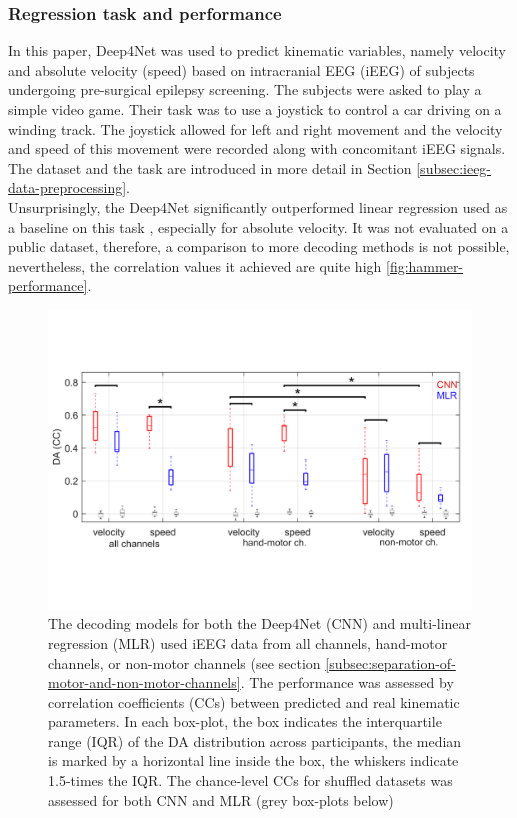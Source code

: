 \subsubsection{Regression task and performance}
In this paper, Deep4Net was used to predict kinematic variables, namely velocity and absolute velocity (speed) based on intracranial EEG (iEEG) of subjects undergoing pre-surgical epilepsy screening. The subjects were asked to play a simple video game. 
Their task was to use a joystick to control a car driving on a winding track. 
The joystick allowed for left and right movement and the velocity and speed of this movement were recorded along with concomitant iEEG signals. 
The dataset and the task are introduced in more detail in Section \ref{subsec:ieeg-data-preprocessing}.\\

Unsurprisingly, the Deep4Net significantly outperformed linear regression used as a baseline on this task \cite{Hammer-2021}, especially for absolute velocity.
It was not evaluated on a public dataset, therefore, a comparison to more decoding methods is not possible, nevertheless, the correlation values it achieved are quite high \ref{fig:hammer-performance}.  

\begin{figure}[!htpb]
\centering
   \includegraphics[width=0.8\linewidth]{img/ch2/hammer-decoding-acc.pdf}
   \caption[Orignial Deep4Net performance]{The decoding models for both the Deep4Net (CNN) and multi-linear regression (MLR) used iEEG data from all channels, hand-motor channels, or non-motor channels (see section \ref{subsec:separation-of-motor-and-non-motor-channels}. The performance was assessed by correlation coefficients (CCs) between predicted and real kinematic parameters. In each box-plot, the box indicates the interquartile range (IQR) of the DA distribution across participants, the median is marked by a horizontal line inside the box, the whiskers indicate 1.5-times the IQR. The chance-level CCs for shuffled datasets was assessed for both CNN and MLR (grey box-plots below)\cite{Hammer-2021}}
\end{figure}\label{fig:hammer-performance}

